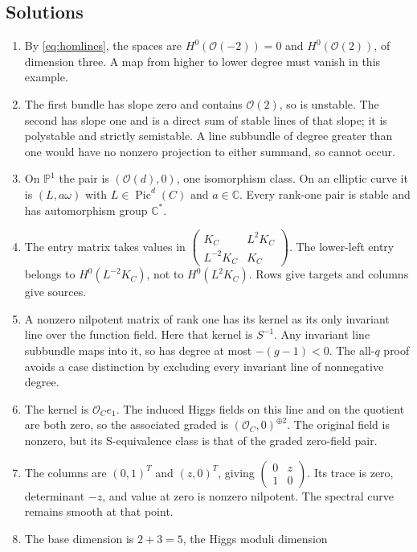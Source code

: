 \documentclass[11pt,a4paper]{article}
\numberwithin{equation}{section}
\theoremstyle{definition}
\newcommand{\OO}{\mathcal O}
\newcommand{\PP}{\mathbb P}
\newcommand{\Pic}{\operatorname{Pic}}
\begin{document}
\subsection*{Solutions}
\begin{enumerate}[label=\textbf{\arabic*.},leftmargin=*]
\item By \eqref{eq:homlines}, the spaces are $H^0(\OO(-2))=0$
and $H^0(\OO(2))$, of dimension three. A map from higher to lower
degree must vanish in this example.
\item The first bundle has slope zero and contains $\OO(2)$,
so is unstable. The second has slope one and is a direct sum
of stable lines of that slope; it is polystable and strictly
semistable. A line subbundle of degree greater than one would
have no nonzero projection to either summand, so cannot occur.
\item On $\PP^1$ the pair is $(\OO(d),0)$, one isomorphism class.
On an elliptic curve it is $(L,a\omega)$ with
$L\in\Pic^d(C)$ and $a\in\mathbb C$. Every rank-one pair is
stable and has automorphism group $\mathbb C^*$.
\item The entry matrix takes values in
$\left(\begin{smallmatrix}K_C&L^2K_C\\L^{-2}K_C&K_C\end{smallmatrix}\right)$.
The lower-left entry belongs to $H^0(L^{-2}K_C)$, not to
$H^0(L^2K_C)$. Rows give targets and columns give sources.
\item A nonzero nilpotent matrix of rank one has its kernel
as its only invariant line over the function field. Here that
kernel is $S^{-1}$. Any invariant line subbundle maps into it,
so has degree at most $-(g-1)<0$. The all-$q$ proof avoids a
case distinction by excluding every invariant line of nonnegative degree.
\item The kernel is $\OO_C e_1$. The induced Higgs fields on
this line and on the quotient are both zero, so the associated
graded is $(\OO_C,0)^{\oplus2}$. The original field is nonzero,
but its S-equivalence class is that of the graded zero-field pair.
\item The columns are $(0,1)^T$ and $(z,0)^T$, giving
$\left(\begin{smallmatrix}0&z\\1&0\end{smallmatrix}\right)$.
Its trace is zero, determinant $-z$, and value at zero is
nonzero nilpotent. The spectral curve remains smooth at that point.
\item The base dimension is $2+3=5$, the Higgs moduli dimension

\end{enumerate}
\end{document}
